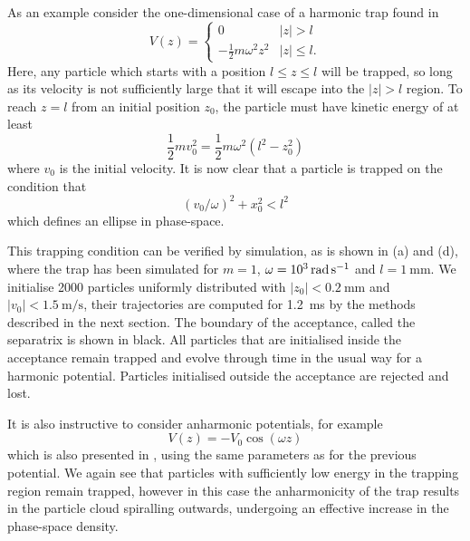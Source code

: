 As an example consider the one-dimensional case of a harmonic trap found in 
%
\begin{equation}
  V(z) = \begin{cases}
    0 & |z| > l \\
    -\frac{1}{2}m\omega^2 z^2 & |z| \leq l.
  \end{cases}
\end{equation}
%
Here, any particle which starts with a position $l \leq z \leq l$ will be
trapped, so long as its velocity is not sufficiently large that it will escape
into the $|z|> l$ region. To reach $z=l$ from an initial position $z_0$, the
particle must have kinetic energy of at least
%
\begin{equation}
  \frac{1}{2}mv_0^2 = \frac{1}{2}m\omega^2(l^2 - z_0^2)
\end{equation}
%
where $v_0$ is the initial velocity. It is now clear that a particle is trapped
on the condition that
%
\begin{equation}
  (v_0/\omega)^2 + x_0^2 < l^2
\end{equation}
%
which defines an ellipse in phase-space.


This trapping condition can be verified by simulation, as is shown in
 (a) and (d), where the trap has been simulated for $m =
1$, $\omega = \SI[parse-numbers=false]{10^3}{\radian\per\second}$ and $l
=\SI{1}{\milli\meter}$. We initialise 2000 particles uniformly distributed with
$|z_0| < \SI{0.2}{\milli\meter}$ and $|v_0|< \SI{1.5}{\meter\per\second}$,
their trajectories are computed for \SI{1.2}{\milli\second} by the methods
described in the next section. The boundary of the acceptance, called the
separatrix is shown in black. All particles that are initialised inside the
acceptance remain trapped and evolve through time in the usual way for a
harmonic potential.  Particles initialised outside the acceptance are rejected
and lost.

It is also instructive to consider anharmonic potentials, for example
%
\begin{equation}
  V(z) = -V_0\cos(\omega z)
\end{equation}
%
which is also presented in , using the same
parameters as for the previous potential. We again see that particles with
sufficiently low energy in the trapping region remain trapped, however in this
case the anharmonicity of the trap results in the particle cloud spiralling
outwards, undergoing an effective increase in the phase-space density.

